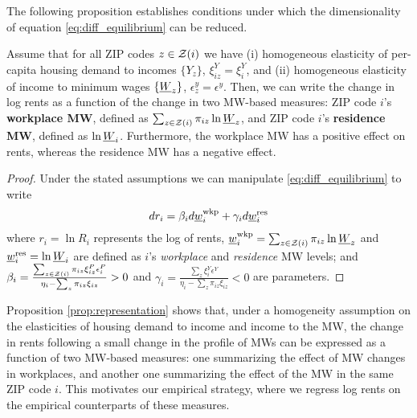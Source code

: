 The following proposition establishes conditions under which the dimensionality
of equation \eqref{eq:diff_equilibrium} can be reduced.

\begin{prop}[Representation]\label{prop:representation}
    Assume that for all ZIP codes $z\in\mathcal{Z}(i)$ we have
    (i) homogeneous elasticity of per-capita housing demand to incomes $\{Y_z\}$,
    $\xi^Y_{iz}=\xi^Y_{i}$, and
    (ii) homogeneous elasticity of income to minimum wages $\{\underline{W}_z\}$,
    $\epsilon_z^y=\epsilon^y$.
    Then, we can write the change in log rents as a function of the change in 
    two MW-based measures: ZIP code $i$'s \textbf{workplace MW}, defined
    as $\sum_{z\in\mathcal{Z}(i)} \pi_{iz} \ln \underline{W}_z$, and 
    ZIP code $i$'s \textbf{residence MW}, defined as $\ln\underline{W}_i$.
    Furthermore, the workplace MW has a positive effect on rents, whereas the
    residence MW has a negative effect.
\end{prop}
\begin{proof}
    Under the stated assumptions we can manipulate \eqref{eq:diff_equilibrium} 
    to write
    \begin{equation} \label{eq:theory_representation}
        d r_i = \beta_i  d \underline{w}^{\text{wkp}}_i
              + \gamma_i d \underline{w}^{\text{res}}_i
    \end{equation}
    where
    $r_i=\ln R_i$ represents the log of rents,
    $\underline{w}^{\text{wkp}}_i = \sum_{z\in\mathcal{Z}(i)} \pi_{iz} \ln \underline{W}_z$ and
    $\underline{w}^{\text{res}}_i = \ln \underline{W}_i$ are defined as $i$'s 
    \textit{workplace} and \textit{residence} MW levels; and
    $\beta_i = \frac{\sum_{z\in\mathcal{Z}(i)}\pi_{iz}\xi_{iz}^{P}\epsilon_{i}^{P}}
                    {\eta_{i} - \sum_z \pi_{iz} \xi_{iz}} 
             >0$ and
    $\gamma_i = \frac{\sum_z \xi_{i}^{Y}\epsilon^{Y}}
                     {\eta_{i} - \sum_z \pi_{iz} \xi_{iz}} 
              < 0$
    are parameters.
\end{proof}

Proposition \ref{prop:representation} shows that, under a homogeneity assumption
on the elasticities of housing demand to income and income to the MW,
the change in rents following a small change in the profile of MWs can be 
expressed as a function of two MW-based measures:
one summarizing the effect of MW changes in workplaces,
and another one summarizing the effect of the MW in the same ZIP code $i$.
This motivates our empirical strategy, where we regress log rents on the empirical
counterparts of these measures.

